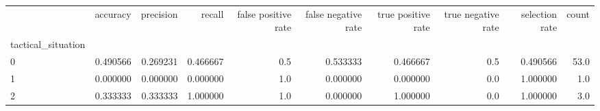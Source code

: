 \begin{tabular}{lrrrrrrrrr}
\toprule
{} &  accuracy &  precision &    recall &  false positive rate &  false negative rate &  true positive rate &  true negative rate &  selection rate &  count \\
tactical\_situation &           &            &           &                      &                      &                     &                     &                 &        \\
\midrule
0                  &  0.490566 &   0.269231 &  0.466667 &                  0.5 &             0.533333 &            0.466667 &                 0.5 &        0.490566 &   53.0 \\
1                  &  0.000000 &   0.000000 &  0.000000 &                  1.0 &             0.000000 &            0.000000 &                 0.0 &        1.000000 &    1.0 \\
2                  &  0.333333 &   0.333333 &  1.000000 &                  1.0 &             0.000000 &            1.000000 &                 0.0 &        1.000000 &    3.0 \\
\bottomrule
\end{tabular}
